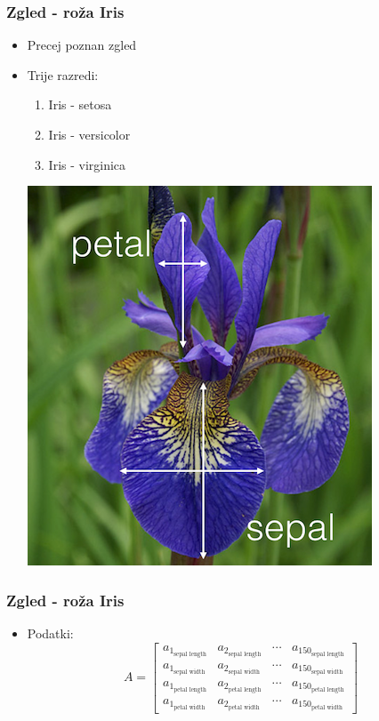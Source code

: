 \documentclass{beamer}
\begin{document}
\begin{frame}
\frametitle{Zgled - roža Iris}
\begin{itemize}
\item Precej poznan zgled
\item Trije razredi:
\begin{enumerate}
\item Iris - setosa
\item Iris - versicolor
\item Iris - virginica
\end{enumerate}
\includegraphics[scale = 0.30]{Iris1}
\end{itemize}
\end{frame}


\begin{frame}
\frametitle{Zgled - roža Iris}
\begin{itemize}
\item Podatki:
\[
A =
\begin{bmatrix}
	a_{1_{\text{sepal  length}}} & a_{2_{\text{sepal  length}}} & \cdots  & a_{150_{\text{sepal  length}}} \\
	a_{1_{\text{sepal  width}}} & a_{2_{\text{sepal width}}} & \cdots  & a_{150_{\text{sepal  width}}} \\
	a_{1_{\text{petal  length}}} & a_{2_{\text{petal  length}}} & \cdots  & a_{150_{\text{petal  length}}} \\
	a_{1_{\text{petal  width}}} & a_{2_{\text{petal  width}}} & \cdots  & a_{150_{\text{petal  width}}}
\end{bmatrix}
\]
\end{itemize}
\end{frame}
\end{document}
